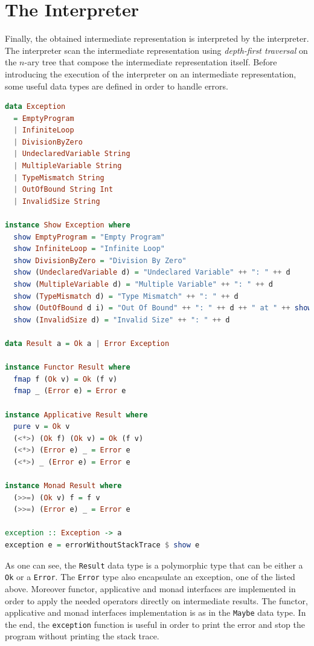 \documentclass[12pt,a4paper]{article}
\begin{document}
\section*{The Interpreter}
Finally, the obtained intermediate representation is interpreted by the interpreter.
The interpreter scan the intermediate representation using \textit{depth-first traversal} on the $n$-ary tree that compose the intermediate representation itself.
Before introducing the execution of the interpreter on an intermediate representation, some useful data types are defined in order to handle errors.
\begin{lstlisting}[language=Haskell, style=custom-style]
data Exception
  = EmptyProgram
  | InfiniteLoop
  | DivisionByZero
  | UndeclaredVariable String
  | MultipleVariable String
  | TypeMismatch String
  | OutOfBound String Int
  | InvalidSize String

instance Show Exception where
  show EmptyProgram = "Empty Program"
  show InfiniteLoop = "Infinite Loop"
  show DivisionByZero = "Division By Zero"
  show (UndeclaredVariable d) = "Undeclared Variable" ++ ": " ++ d
  show (MultipleVariable d) = "Multiple Variable" ++ ": " ++ d
  show (TypeMismatch d) = "Type Mismatch" ++ ": " ++ d
  show (OutOfBound d i) = "Out Of Bound" ++ ": " ++ d ++ " at " ++ show i
  show (InvalidSize d) = "Invalid Size" ++ ": " ++ d

data Result a = Ok a | Error Exception

instance Functor Result where
  fmap f (Ok v) = Ok (f v)
  fmap _ (Error e) = Error e

instance Applicative Result where
  pure v = Ok v
  (<*>) (Ok f) (Ok v) = Ok (f v)
  (<*>) (Error e) _ = Error e
  (<*>) _ (Error e) = Error e

instance Monad Result where
  (>>=) (Ok v) f = f v
  (>>=) (Error e) _ = Error e

exception :: Exception -> a
exception e = errorWithoutStackTrace $ show e
\end{lstlisting}
As one can see, the \texttt{Result} data type is a polymorphic type that can be either a \texttt{Ok} or a \texttt{Error}.
The \texttt{Error} type also encapsulate an exception, one of the listed above.
Moreover functor, applicative and monad interfaces are implemented in order to apply the needed operators directly on intermediate results.
The functor, applicative and monad interfaces implementation is as in the \texttt{Maybe} data type.
In the end, the \texttt{exception} function is useful in order to print the error and stop the program without printing the stack trace.
\end{document}
